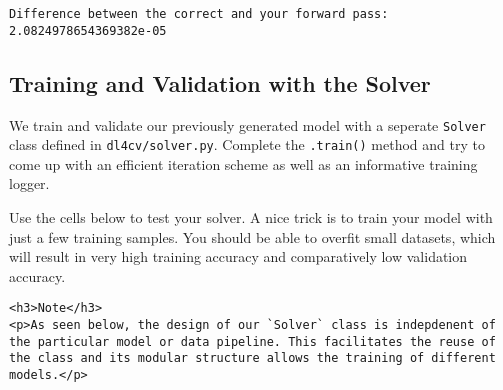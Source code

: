 \documentclass[11pt]{article}
\begin{document}
    \begin{Verbatim}[commandchars=\\\{\}]
Difference between the correct and your forward pass:
2.0824978654369382e-05

    \end{Verbatim}

    \subsection{Training and Validation with the
Solver}\label{training-and-validation-with-the-solver}

We train and validate our previously generated model with a seperate
\texttt{Solver} class defined in \texttt{dl4cv/solver.py}. Complete the
\texttt{.train()} method and try to come up with an efficient iteration
scheme as well as an informative training logger.

Use the cells below to test your solver. A nice trick is to train your
model with just a few training samples. You should be able to overfit
small datasets, which will result in very high training accuracy and
comparatively low validation accuracy.

\begin{verbatim}
<h3>Note</h3>
<p>As seen below, the design of our `Solver` class is indepdenent of the particular model or data pipeline. This facilitates the reuse of the class and its modular structure allows the training of different models.</p>
\end{verbatim}
\end{document}
